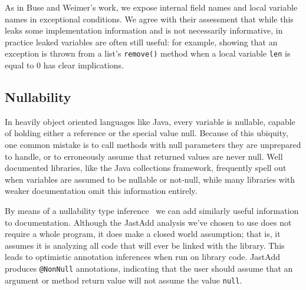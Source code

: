 As in Buse and Weimer's work, we expose internal field names and
local variable names in exceptional conditions.  We agree with their assessment
that while this leaks some
implementation information and is not necessarily informative, in practice
leaked variables are often still useful: for example, showing that an exception is
thrown from a list's \texttt{remove()} method when a local variable \texttt{len}
is equal to 0 has clear implications.

\subsection{Nullability}
\label{sec:Nullability}

In heavily object oriented languages like Java, every variable is nullable,
capable of holding either a reference or the
special value null.  Because of this ubiquity, one common mistake is to call
methods with null parameters they are unprepared to handle, or to erroneously
assume that returned values are never null.  Well documented libraries, like
the Java collections framework, frequently spell out when variables are
assumed to be nullable or not-null, while many libraries with weaker
documentation omit this information entirely.

By means of a nullability type inference~\cite{NonNullTypeInference} we can add
similarly useful information to documentation.  Although the JastAdd analysis
we've chosen to use does not require a whole program, it does make a closed
world assumption; that is, it assumes it is analyzing all code that will ever be
linked with the library.  This leads to optimistic annotation inferences when run on
library code.  JastAdd produces \texttt{@NonNull} annotations, indicating that the user should assume that an
argument or method return value will not assume the value \texttt{null}.

